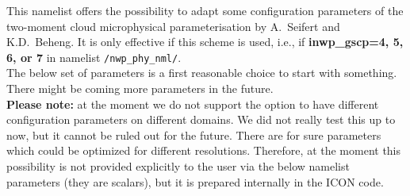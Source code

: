 This namelist offers the possibility to adapt some configuration parameters of the two-moment cloud microphysical parameterisation by A.~Seifert and K.D.~Beheng. It is only effective if this scheme is used, i.e., if \textbf{inwp\_gscp=4, 5, 6, or 7} in namelist \texttt{/nwp\_phy\_nml/}.\\[-0.5em]

The below set of parameters is a first reasonable choice to start with something. There might be coming more parameters in the future.\\[-0.5em]

\textbf{Please note:} at the moment we do not support the option to have different configuration parameters on different domains.
We did not really test this up to now, but it cannot be ruled out for the future.
There are for sure parameters which could be optimized for different resolutions. Therefore, at the moment this possibility is not provided explicitly to the user via the below namelist parameters (they are scalars), but it is prepared internally in the ICON code.


